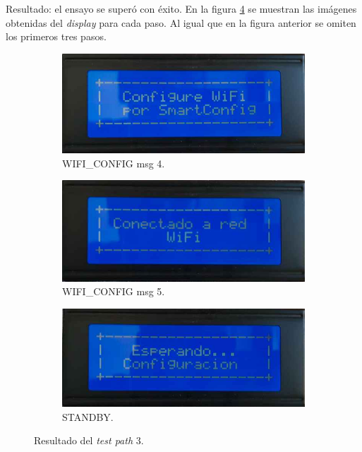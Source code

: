 \pagebreak
Resultado: el ensayo se superó con éxito. En la figura \ref{fig:pruIni_3_res} se muestran las imágenes obtenidas del \textit{display} para cada paso. Al igual que en la figura anterior se omiten los primeros tres pasos. 

\begin{figure}[!htpb]
     \centering
     \begin{subfigure}[b]{0.4\textwidth}
         \centering
         \includegraphics[width=1.1\textwidth]{./Figures/Conf_SmartConf.jpeg}
         \caption{WIFI\_CONFIG msg 4.}
         \label{fig:pruIni_3_1}
     \end{subfigure}
           \hfill
     \begin{subfigure}[b]{0.4\textwidth}
         \centering
         \includegraphics[width=1.1\textwidth]{./Figures/Conect_to_WiFi.jpeg}
         \caption{WIFI\_CONFIG msg 5.}
         \label{fig:pruIni_3_2}
     \end{subfigure}
           \hfill
     \begin{subfigure}[b]{0.4\textwidth}
         \centering
         \includegraphics[width=1.1\textwidth]{./Figures/Esp_Conf.jpeg}
         \caption{STANDBY.}
         \label{fig:pruIni_3_3}
     \end{subfigure}
        \caption{Resultado del \textit{test path} 3.}
        \label{fig:pruIni_3_res}
\end{figure}

